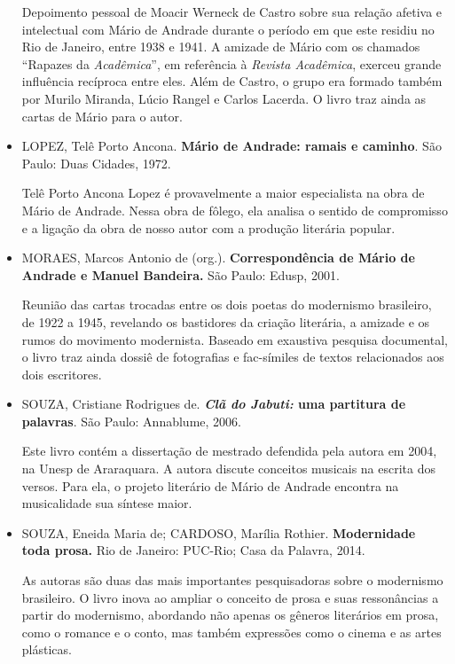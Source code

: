 \documentclass[11pt]{extarticle}
\begin{document}
\begin{itemize}
Depoimento pessoal de Moacir Werneck de Castro sobre sua relação afetiva
e intelectual com Mário de Andrade durante o período em que este residiu
no Rio de Janeiro, entre 1938 e 1941. A amizade de Mário com os chamados
``Rapazes da \emph{Acadêmica}'', em referência à \emph{Revista
Acadêmica}, exerceu grande influência recíproca entre eles. Além de
Castro, o grupo era formado também por Murilo Miranda, Lúcio Rangel e
Carlos Lacerda. O livro traz ainda as cartas de Mário para o autor.

\item LOPEZ, Telê Porto Ancona. \textbf{Mário de Andrade: ramais e caminho}.
São Paulo: Duas Cidades, 1972.

Telê Porto Ancona Lopez é provavelmente a maior especialista na obra de
Mário de Andrade. Nessa obra de fôlego, ela analisa o sentido de
compromisso e a ligação da obra de nosso autor com a produção literária
popular.

\item MORAES, Marcos Antonio de (org.). \textbf{Correspondência de Mário de
Andrade e Manuel Bandeira.} São Paulo: Edusp, 2001.

Reunião das cartas trocadas entre os dois poetas do modernismo
brasileiro, de 1922 a 1945, revelando os bastidores da criação
literária, a amizade e os rumos do movimento modernista. Baseado em
exaustiva pesquisa documental, o livro traz ainda dossiê de fotografias
e fac-símiles de textos relacionados aos dois escritores.

\item SOUZA, Cristiane Rodrigues de. \textbf{\emph{Clã do Jabuti:} uma
partitura de palavras}. São Paulo: Annablume, 2006.

Este livro contém a dissertação de mestrado defendida pela autora em
2004, na Unesp de Araraquara. A autora discute conceitos musicais na
escrita dos versos. Para ela, o projeto literário de Mário de Andrade
encontra na musicalidade sua síntese maior.

\item SOUZA, Eneida Maria de; CARDOSO, Marília Rothier. \textbf{Modernidade
toda prosa.} Rio de Janeiro: PUC-Rio; Casa da Palavra, 2014.

As autoras são duas das mais importantes pesquisadoras sobre o
modernismo brasileiro. O livro inova ao ampliar o conceito de prosa e
suas ressonâncias a partir do modernismo, abordando não apenas os
gêneros literários em prosa, como o romance e o conto, mas também
expressões como o cinema e as artes plásticas.


\end{itemize}
\end{document}
